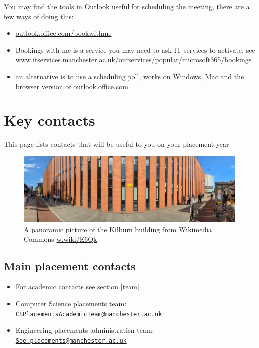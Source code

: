 \documentclass[
]{book}
\providecommand{\tightlist}{%
  \setlength{\itemsep}{0pt}\setlength{\parskip}{0pt}}
\begin{document}
You may find the tools in Outlook useful for scheduling the meeting, there are a few ways of doing this:

\begin{itemize}
\tightlist
\item
  \href{https://outlook.office.com/bookwithme}{outlook.office.com/bookwithme}
\item
  Bookings with me is a service you may need to ask IT services to activate, see \href{https://www.itservices.manchester.ac.uk/ourservices/popular/microsoft365/bookings/}{www.itservices.manchester.ac.uk/ourservices/popular/microsoft365/bookings}
\item
  an alternative is to use a scheduling poll, works on Windows, Mac and the browser version of outlook.office.com \citep{poll}
\end{itemize}

\chapter{Key contacts}\label{contacts}

This page lists contacts that will be useful to you on your placement year

\begin{figure}

{\centering \includegraphics[width=1\linewidth]{images/kilburnarama} 

}

\caption{A panoramic picture of the Kilburn building from Wikimedia Commons \href{https://w.wiki/E6Qk}{w.wiki/E6Qk}}\label{fig:kilburn-fig}
\end{figure}



\section{Main placement contacts}\label{main}

\begin{itemize}
\tightlist
\item
  For academic contacts see section \ref{team}
\item
  Computer Science placements team: \href{mailto:CSPlacementsAcademicTeam@manchester.ac.uk}{\nolinkurl{CSPlacementsAcademicTeam@manchester.ac.uk}}
\item
  Engineering placements administration team: \href{mailto:Soe.placements@manchester.ac.uk}{\nolinkurl{Soe.placements@manchester.ac.uk}}
\end{itemize}
\end{document}

